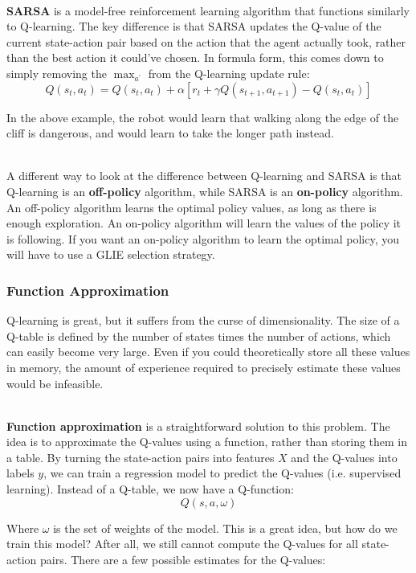 \documentclass[12pt]{article}
\begin{document}
\noindent
\\
\textbf{SARSA} is a model-free reinforcement learning algorithm that functions similarly to Q-learning.
The key difference is that SARSA updates the Q-value of the current state-action pair based on the action that the agent actually took, rather than the best action it could've chosen.
In formula form, this comes down to simply removing the $\max_{a^\prime}$ from the Q-learning update rule:
\[ Q(s_t, a_t) = Q(s_t, a_t) + \alpha \left[ r_t + \gamma Q(s_{t + 1}, a_{t + 1}) - Q(s_t, a_t) \right] \]

\noindent
In the above example, the robot would learn that walking along the edge of the cliff is dangerous, and would learn to take the longer path instead.

\noindent
\\
A different way to look at the difference between Q-learning and SARSA is that Q-learning is an \textbf{off-policy} algorithm, while SARSA is an \textbf{on-policy} algorithm.
An off-policy algorithm learns the optimal policy values, as long as there is enough exploration.
An on-policy algorithm will learn the values of the policy it is following.
If you want an on-policy algorithm to learn the optimal policy, you will have to use a GLIE selection strategy.

\subsubsection{Function Approximation}
Q-learning is great, but it suffers from the curse of dimensionality.
The size of a Q-table is defined by the number of states times the number of actions, which can easily become very large.
Even if you could theoretically store all these values in memory, the amount of experience required to precisely estimate these values would be infeasible.

\noindent
\\
\textbf{Function approximation} is a straightforward solution to this problem.
The idea is to approximate the Q-values using a function, rather than storing them in a table.
By turning the state-action pairs into features $X$ and the Q-values into labels $y$, we can train a regression model to predict the Q-values (i.e. supervised learning).
Instead of a Q-table, we now have a Q-function:
\[ Q(s, a, \omega) \]

\noindent
Where $\omega$ is the set of weights of the model.
This is a great idea, but how do we train this model?
After all, we still cannot compute the Q-values for all state-action pairs.
There are a few possible estimates for the Q-values: 
\end{document}
